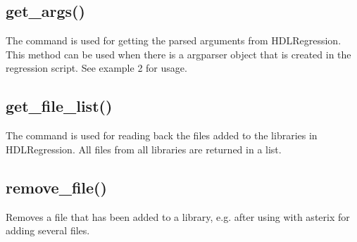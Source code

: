 \documentclass[letterpaper,10pt,english]{sphinxmanual}
\begin{document}
\subsection{get\_args()}
\label{\detokenize{api:get-args}}
\sphinxAtStartPar
The command is used for getting the parsed arguments from HDLRegression.
This method can be used when there is a argparser object that is created in the regression script.
See {\hyperref[\detokenize{api:hdlregression}]{}} example 2 for usage.

\sphinxAtStartPar
{}

\begin{sphinxVerbatim}[commandchars=\\\{\}]
  
\end{sphinxVerbatim}


\subsection{get\_file\_list()}
\label{\detokenize{api:get-file-list}}
\sphinxAtStartPar
The command is used for reading back the files added to the libraries in HDLRegression.
All files from all libraries are returned in a list.

\sphinxAtStartPar
{}

\begin{sphinxVerbatim}[commandchars=\\\{\}]
  
\end{sphinxVerbatim}


\subsection{remove\_file()}
\label{\detokenize{api:remove-file}}
\sphinxAtStartPar
Removes a file that has been added to a library, e.g. after using  with asterix for adding several files.

\begin{sphinxVerbatim}[commandchars=\\\{\}]
 
\end{sphinxVerbatim}
\end{document}
